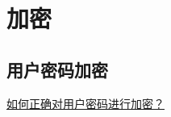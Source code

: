 \chapter{加密}


\section{用户密码加密}



\href{https://www.infoq.cn/article/how-to-encrypt-the-user-password-correctly}{如何正确对用户密码进行加密？}


